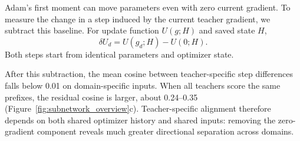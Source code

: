 Adam's first moment can move parameters even with zero current gradient. To measure the change in a step induced by the current teacher gradient, we subtract this baseline. For update function $U(g;H)$ and saved state $H$,
\begin{equation}
\delta U_d=U(g_d;H)-U(0;H).
\label{eq:history_subtracted}
\end{equation}
Both steps start from identical parameters and optimizer state.

After this subtraction, the mean cosine between teacher-specific step differences falls below 0.01 on domain-specific inputs. When all teachers score the same prefixes, the residual cosine is larger, about 0.24--0.35 (Figure~\ref{fig:subnetwork_overview}c). Teacher-specific alignment therefore depends on both shared optimizer history and shared inputs: removing the zero-gradient component reveals much greater directional separation across domains.
